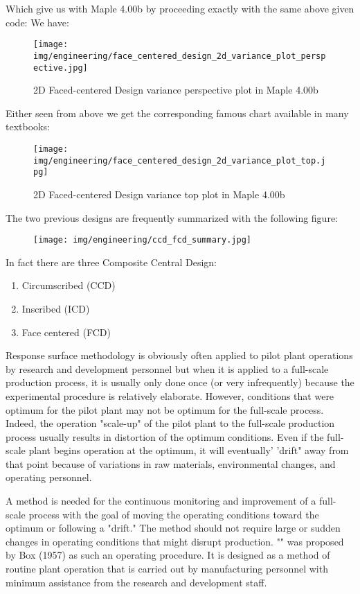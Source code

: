 	Which give us with Maple 4.00b by proceeding exactly with the same above given code:
	We have:
	\begin{figure}[H]
		\centering
		\texttt{[image: img/engineering/face\_centered\_design\_2d\_variance\_plot\_perspective.jpg]}	
		\caption{2D Faced-centered Design variance perspective plot in Maple 4.00b}
	\end{figure}
	Either seen from above we get the corresponding famous chart available in many textbooks:
	\begin{figure}[H]
		\centering
		\texttt{[image: img/engineering/face\_centered\_design\_2d\_variance\_plot\_top.jpg]}	
		\caption{2D Faced-centered Design variance top plot in Maple 4.00b}
	\end{figure}
	The two previous designs are frequently summarized with the following figure:
	\begin{figure}[H]
		\centering
		\texttt{[image: img/engineering/ccd\_fcd\_summary.jpg]}	
	\end{figure}
	In fact there are three Composite Central Design:
	\begin{enumerate}
		\item Circumscribed (CCD)
		\item Inscribed (ICD)
		\item Face centered (FCD)
	\end{enumerate}
	Response surface methodology is obviously often applied to pilot plant operations by research and development personnel but when it is applied to a full-scale production process, it is usually only done once (or very infrequently) because the experimental procedure is relatively elaborate. However, conditions that were optimum for the pilot plant may not be optimum for the full-scale process. Indeed, the operation "scale-up" of the pilot plant to the full-scale production process usually results in distortion of the optimum conditions. Even if the full-scale plant begins operation at the optimum, it will eventually' 'drift" away from that point because of variations in raw materials, environmental changes, and operating personnel.

	A method is needed for the continuous monitoring and improvement of a full-scale process with the goal of moving the operating conditions toward the optimum or following a "drift." The method should not require large or sudden changes in operating conditions that might disrupt production. "" was proposed by Box (1957) as such an operating procedure. It is designed as a method of routine plant operation that is carried out by manufacturing personnel with minimum assistance from the research and development staff.
	
